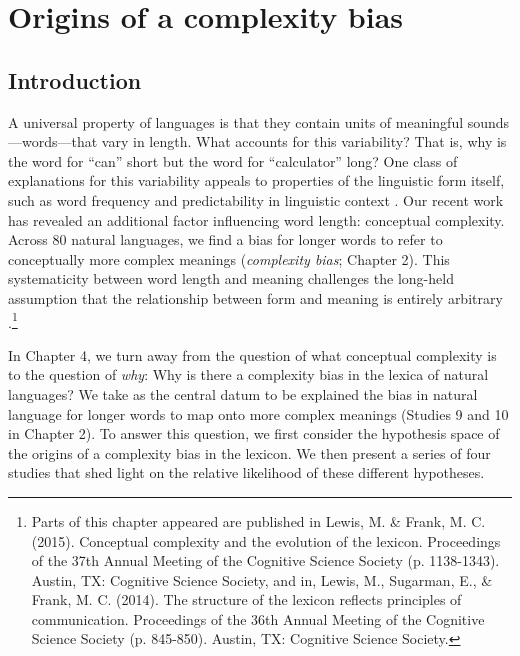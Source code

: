 
\chapter{Origins of a complexity bias}
\label{chapter:origins}

\section{Introduction}

A universal property of languages is that they contain units of meaningful sounds---words---that vary in length. What accounts for this variability? That is, why is the word for ``can'' short but the word for ``calculator'' long? One class of explanations for this variability appeals to properties of the linguistic form itself, such as word frequency \cite{zipf1936} and predictability in linguistic context \cite{piantadosi2011a,mahowald2013info}. Our recent work has revealed an additional factor influencing word length: conceptual complexity. Across 80 natural languages, we find a bias for longer words to refer to conceptually more complex meanings ({\it complexity bias}; Chapter 2). This systematicity between word length and meaning challenges the long-held assumption that the relationship between form and meaning is entirely arbitrary \cite{saussure}.\footnote{Parts of this chapter appeared are published in  Lewis, M. \& Frank, M. C. (2015). Conceptual complexity and the evolution of the lexicon. Proceedings of the 37th Annual Meeting of the Cognitive Science Society (p. 1138-1343). Austin, TX: Cognitive Science Society, and in,  Lewis, M., Sugarman, E., \& Frank, M. C. (2014). The structure of the lexicon reflects principles of communication. Proceedings of the 36th Annual Meeting of the Cognitive Science Society (p. 845-850). Austin, TX: Cognitive Science Society.}

In Chapter 4, we turn away from the question of what conceptual complexity is to the question of {\it why}: Why is there a complexity bias in the lexica of natural languages? We take as the central datum to be explained the bias in natural language for longer words to map onto more complex meanings (Studies 9 and 10 in Chapter 2).  To answer this question, we first consider the hypothesis space of the origins of a complexity bias in the lexicon. We then present a series of four studies that shed light on the relative likelihood of these different hypotheses. 

